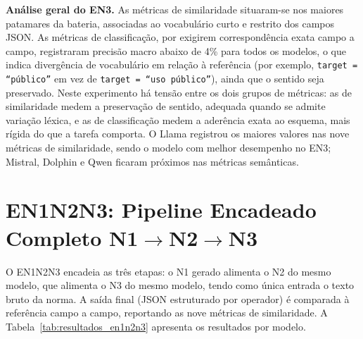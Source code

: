 \textbf{Análise geral do EN3.} As métricas de similaridade situaram-se nos maiores patamares da bateria, associadas ao vocabulário curto e restrito dos campos JSON. As métricas de classificação, por exigirem correspondência exata campo a campo, registraram precisão macro abaixo de 4\% para todos os modelos, o que indica divergência de vocabulário em relação à referência (por exemplo, \texttt{target = ``público''} em vez de \texttt{target = ``uso público''}), ainda que o sentido seja preservado. Neste experimento há tensão entre os dois grupos de métricas: as de similaridade medem a preservação de sentido, adequada quando se admite variação léxica, e as de classificação medem a aderência exata ao esquema, mais rígida do que a tarefa comporta. O Llama registrou os maiores valores nas nove métricas de similaridade, sendo o modelo com melhor desempenho no EN3; Mistral, Dolphin e Qwen ficaram próximos nas métricas semânticas.

\section{EN1N2N3: Pipeline Encadeado Completo N1\texorpdfstring{$\rightarrow$}{-}N2\texorpdfstring{$\rightarrow$}{-}N3}
\label{sec:res_en1n2n3}

O EN1N2N3 encadeia as três etapas: o N1 gerado alimenta o N2 do mesmo modelo, que alimenta o N3 do mesmo modelo, tendo como única entrada o texto bruto da norma. A saída final (JSON estruturado por operador) é comparada à referência campo a campo, reportando as nove métricas de similaridade. A Tabela~\ref{tab:resultados_en1n2n3} apresenta os resultados por modelo.

